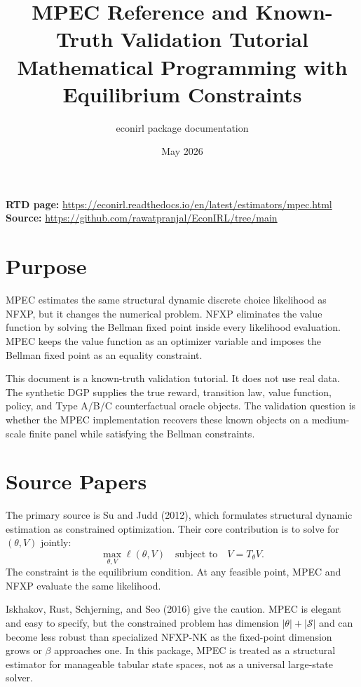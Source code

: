 \documentclass[10pt]{article}
\title{MPEC Reference and Known-Truth Validation Tutorial\\[3pt]
\large Mathematical Programming with Equilibrium Constraints}
\author{econirl package documentation}
\date{May 2026}
\begin{document}
\maketitle

\begin{center}
\small
\textbf{RTD page:}
\url{https://econirl.readthedocs.io/en/latest/estimators/mpec.html}
\quad
\textbf{Source:}
\url{https://github.com/rawatpranjal/EconIRL/tree/main}
\end{center}

\section{Purpose}

MPEC estimates the same structural dynamic discrete choice likelihood as
NFXP, but it changes the numerical problem. NFXP eliminates the value function
by solving the Bellman fixed point inside every likelihood evaluation. MPEC
keeps the value function as an optimizer variable and imposes the Bellman
fixed point as an equality constraint.

This document is a known-truth validation tutorial. It does not use real data.
The synthetic DGP supplies the true reward, transition law, value function,
policy, and Type A/B/C counterfactual oracle objects. The validation question
is whether the MPEC implementation recovers these known objects on a
medium-scale finite panel while satisfying the Bellman constraints.

\section{Source Papers}

The primary source is Su and Judd (2012), which formulates structural dynamic
estimation as constrained optimization. Their core contribution is to solve
for \((\theta,V)\) jointly:
\[
\max_{\theta,V} \ell(\theta,V)
\quad\text{subject to}\quad
V = T_\theta V.
\]
The constraint is the equilibrium condition. At any feasible point, MPEC and
NFXP evaluate the same likelihood.

Iskhakov, Rust, Schjerning, and Seo (2016) give the caution. MPEC is elegant
and easy to specify, but the constrained problem has dimension
\(|\theta|+|\mathcal S|\) and can become less robust than specialized NFXP-NK
as the fixed-point dimension grows or \(\beta\) approaches one. In this
package, MPEC is treated as a structural estimator for manageable tabular
state spaces, not as a universal large-state solver.
\end{document}
